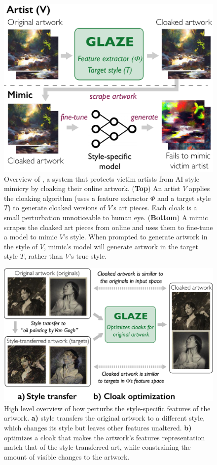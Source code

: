 \begin{figure}[t]
  \centering
  \includegraphics[width=0.9\columnwidth]{plots/overview/cloak-scenario-emily.pdf}
  \caption{Overview of \system{}, a system that protects victim artists from AI style mimicry by cloaking their online artwork. ({\bf Top}) An artist $V$ applies the cloaking algorithm (uses a feature extractor $\Phi$ and a target style $T$) to generate cloaked versions of $V$'s art pieces. Each cloak is a small perturbation unnoticeable to human eye. ({\bf Bottom}) A mimic scrapes the cloaked art pieces from online and uses them to fine-tune a model to mimic $V$'s style. When prompted to generate artwork in the style of $V$, mimic's model will generate artwork in the target style $T$, rather than $V$'s true style. }
  \label{fig:cloaking}
\end{figure}

\begin{figure}[t]
  \centering
  \includegraphics[width=1\columnwidth]{plots/overview/cloak-intuition-2-emily.pdf}
  \caption{High level overview of how \system{} perturbs the style-specific features of the artwork. {\bf a)} \system{} style transfers the original artwork to a different style, which changes its style but leaves other features unaltered. {\bf b)} \system{} optimizes a cloak that makes the artwork's features representation match that of the style-transferred art, while constraining the amount of visible changes to the artwork.  }
  \label{fig:cloak-intuition}
  \vspace{-0.3cm}
\end{figure}

